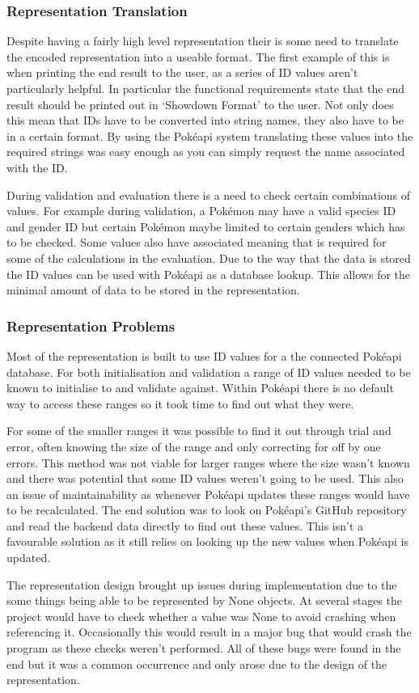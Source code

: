 \documentclass[a4paper]{article}
\newcommand{\Pokemon}{Pok\'{e}mon}
\newcommand{\Pokeapi}{Pok\'{e}api}
\begin{document}
\subsubsection{Representation Translation}
\par
Despite having a fairly high level representation their is some need to translate the encoded representation into a useable format.
The first example of this is when printing the end result to the user, as a series of ID values aren't particularly helpful.
In particular the functional requirements state that the end result should be printed out in `Showdown Format' to the user.
Not only does this mean that IDs have to be converted into string names, they also have to be in a certain format.
By using the \Pokeapi{} system translating these values into the required strings was easy enough as you can simply request the name associated with the ID\@.
\par
During validation and evaluation there is a need to check certain combinations of values.
For example during validation, a \Pokemon{} may have a valid species ID and gender ID but certain \Pokemon{} maybe limited to certain genders which has to be checked.
Some values also have associated meaning that is required for some of the calculations in the evaluation. Due to the way that the data is stored the ID values can be used with \Pokeapi{} as a database lookup.
This allows for the minimal amount of data to be stored in the representation.
\subsubsection{Representation Problems}
\par
Most of the representation is built to use ID values for a the connected \Pokeapi{} database.
For both initialisation and validation a range of ID values needed to be known to initialise to and validate against.
Within \Pokeapi{} there is no default way to access these ranges so it took time to find out what they were.
\par
For some of the smaller ranges it was possible to find it out through trial and error, often knowing the size of the range and only correcting for off by one errors.
This method was not viable for larger ranges where the size wasn't known and there was potential that some ID values weren't going to be used.
This also an issue of maintainability as whenever \Pokeapi{} updates these ranges would have to be recalculated.
The end solution was to look on \Pokeapi{}'s GitHub repository and read the backend data directly to find out these values\cite{PokeapiGitHub}.
This isn't a favourable solution as it still relies on looking up the new values when \Pokeapi{} is updated.
\\ \par
The representation design brought up issues during implementation due to the some things being able to be represented by None objects.
At several stages the project would have to check whether a value was None to avoid crashing when referencing it.
Occasionally this would result in a major bug that would crash the program as these checks weren't performed.
All of these bugs were found in the end but it was a common occurrence and only arose due to the design of the representation.
\end{document}
